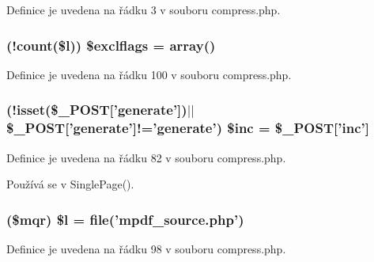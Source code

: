 Definice je uvedena na řádku 3 v souboru compress.\-php.

\hypertarget{compress_8php_a4907d78471b733b785612f142bb48713}{
\subsubsection[{\$exclflags}]{ (!count(\$l)) \$exclflags = array()}}\label{compress_8php_a4907d78471b733b785612f142bb48713}


Definice je uvedena na řádku 100 v souboru compress.\-php.

\hypertarget{compress_8php_abd0a3dd79eead9d44a0c329f65d5370f}{
\subsubsection[{\$inc}]{ (!isset(\$\-\_\-\-P\-O\-S\-T\mbox{[}'generate'\mbox{]})$|$$|$\$\-\_\-\-P\-O\-S\-T\mbox{[}'generate'\mbox{]}!='generate') \$inc = \$\-\_\-\-P\-O\-S\-T\mbox{[}'inc'\mbox{]}}}\label{compress_8php_abd0a3dd79eead9d44a0c329f65d5370f}


Definice je uvedena na řádku 82 v souboru compress.\-php.



Používá se v Single\-Page().

\hypertarget{compress_8php_af45644c73f443e318c38efee2cb538bc}{
\subsubsection[{\$l}]{ (\$mqr) \$l = file('mpdf\-\_\-source.\-php')}}\label{compress_8php_af45644c73f443e318c38efee2cb538bc}


Definice je uvedena na řádku 98 v souboru compress.\-php.



